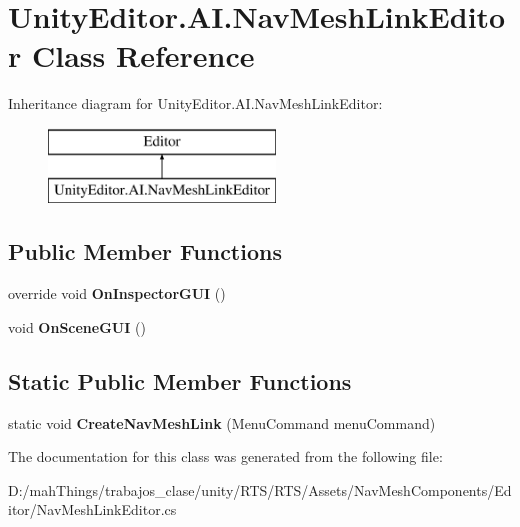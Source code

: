 \hypertarget{class_unity_editor_1_1_a_i_1_1_nav_mesh_link_editor}{}\section{Unity\+Editor.\+A\+I.\+Nav\+Mesh\+Link\+Editor Class Reference}
\label{class_unity_editor_1_1_a_i_1_1_nav_mesh_link_editor}
Inheritance diagram for Unity\+Editor.\+A\+I.\+Nav\+Mesh\+Link\+Editor\+:\begin{figure}[H]
\begin{center}
\leavevmode
\includegraphics[height=2.000000cm]{class_unity_editor_1_1_a_i_1_1_nav_mesh_link_editor}
\end{center}
\end{figure}
\subsection*{Public Member Functions}
\begin{DoxyCompactItemize}
\item 
\mbox{\label{class_unity_editor_1_1_a_i_1_1_nav_mesh_link_editor_a98a716e5a9cd9846502c113b32a75cde}} 
override void {\bfseries On\+Inspector\+G\+UI} ()
\item 
\mbox{\label{class_unity_editor_1_1_a_i_1_1_nav_mesh_link_editor_ad705e4c42737c195408391b55a48ae66}} 
void {\bfseries On\+Scene\+G\+UI} ()
\end{DoxyCompactItemize}
\subsection*{Static Public Member Functions}
\begin{DoxyCompactItemize}
\item 
\mbox{\label{class_unity_editor_1_1_a_i_1_1_nav_mesh_link_editor_a03143817f1723cad74f8133210173020}} 
static void {\bfseries Create\+Nav\+Mesh\+Link} (Menu\+Command menu\+Command)
\end{DoxyCompactItemize}


The documentation for this class was generated from the following file\+:\begin{DoxyCompactItemize}
\item 
D\+:/mah\+Things/trabajos\+\_\+clase/unity/\+R\+T\+S/\+R\+T\+S/\+Assets/\+Nav\+Mesh\+Components/\+Editor/Nav\+Mesh\+Link\+Editor.\+cs\end{DoxyCompactItemize}
